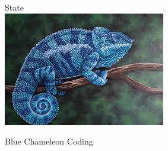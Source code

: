 \documentclass[
	english,
	a4paper,
	fontsize=10pt,
	parskip=half,
	titlepage=true,
	DIV=12,
	final
]{scrreprt}
\title{\myTitle}
\subtitle{\mySubtitle}
\author{\myName}
\date{\today}
\newcommand\blankpage{%
		\null
		\thispagestyle{empty}%
		\addtocounter{page}{-1}%
		\newpage}
\begin{document}
	\begin{titlepage}
		\centering
		\makeatletter

		{\phantom{x}}
		
		\vspace{6\tabcolsep}
		\Huge \textsc{\@title}

		\vspace{6\tabcolsep}
		\LARGE \textsc{\@subtitle}

		\vspace{6\tabcolsep}
		\large
		State \@date\\
		
		\vspace{7\tabcolsep}
		\includegraphics[width=.5\paperwidth]{./gfx/chameleon-dummy}

		\vspace{6\tabcolsep}
		\large
		Blue Chameleon Coding \\
		
		\makeatother			%
	\end{titlepage}

	{
		\pagestyle{empty}
		\renewcommand*{\chapterpagestyle}{empty}

		\blankpage
		
		\blankpage
		\tableofcontents

		\clearpage
	}

	\setcounter{page}{1}

	
%	
%	
%	
%	
%	
%	
%	
%	
%	
%	
%	
%	
%	
%	
%	
%	
%	
%
	

	\listoffigures
\end{document}
